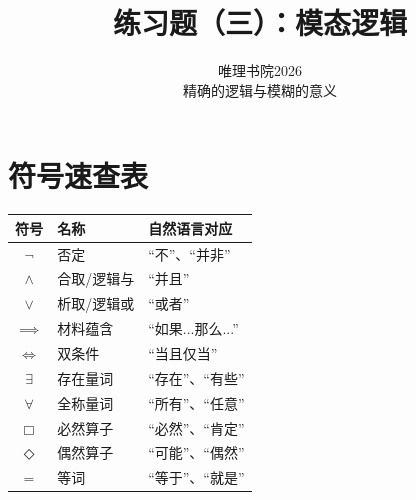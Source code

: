 \documentclass{quiz}
\title{\textbf{练习题（三）：模态逻辑}}
\author{唯理书院2026\\精确的逻辑与模糊的意义}
\date{}
\begin{document}
\maketitle


\vspace{5ex}
\section*{\centering 符号速查表}

  \begin{center}
  \begin{tabular}{cll}
    \textbf{符号} & \textbf{名称} & \textbf{自然语言对应} \\\midrule
    $\neg$ & 否定 & “不”、“并非” \\
    $\land$ & 合取/逻辑与 & “并且” \\
    $\lor$ & 析取/逻辑或 & “或者” \\
    $\implies$ & 材料蕴含 & “如果...那么...” \\
    $\iff$ & 双条件 & “当且仅当” \\
    $\exists$ & 存在量词 & “存在”、“有些” \\
    $\forall$ & 全称量词 & “所有”、“任意” \\
    $\Box$ & 必然算子 & “必然”、“肯定” \\
    $\Diamond$ & 偶然算子 & “可能”、“偶然” \\
    $=$ & 等词 & “等于”、“就是”
  \end{tabular}
  \end{center}



\end{document}
